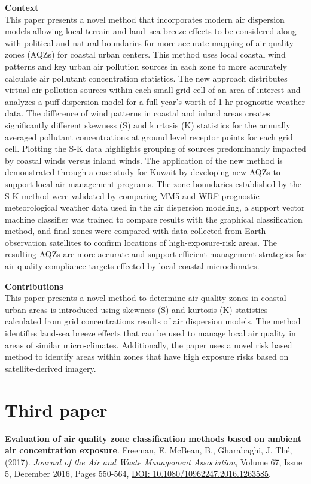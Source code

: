 \vspace{5mm}
\noindent
\textbf{Context}\\
\noindent
This paper presents a novel method that incorporates modern air dispersion models allowing local terrain and land–sea breeze effects to be considered along with political and natural boundaries for more accurate mapping of air quality zones (AQZs) for coastal urban centers. This method uses local coastal wind patterns and key urban air pollution sources in each zone to more accurately calculate air pollutant concentration statistics. The new approach distributes virtual air pollution sources within each small grid cell of an area of interest and analyzes a puff dispersion model for a full year’s worth of 1-hr prognostic weather data. The difference of wind patterns in coastal and inland areas creates significantly different skewness (S) and kurtosis (K) statistics for the annually averaged pollutant concentrations at ground level receptor points for each grid cell. Plotting the S-K data highlights grouping of sources predominantly impacted by coastal winds versus inland winds. The application of the new method is demonstrated through a case study for Kuwait by developing new AQZs to support local air management programs. The zone boundaries established by the S-K method were validated by comparing MM5 and WRF prognostic meteorological weather data used in the air dispersion modeling, a support vector machine classifier was trained to compare results with the graphical classification method, and final zones were compared with data collected from Earth observation satellites to confirm locations of high-exposure-risk areas. The resulting AQZs are more accurate and support efficient management strategies for air quality compliance targets effected by local coastal microclimates.

\vspace{5mm}
\noindent
\textbf{Contributions}\\
\noindent
This paper presents a novel method to determine air quality zones in coastal urban areas is introduced using skewness (S) and kurtosis (K) statistics calculated from grid concentrations results of air dispersion models.  The method identifies land-sea breeze effects that can be used to manage local air quality in areas of similar micro-climates. Additionally, the paper uses a novel risk based method to identify areas within zones that have high exposure risks based on satellite-derived imagery.

\section{Third paper}
\noindent
\textbf{Evaluation of air quality zone classification methods based on ambient air concentration exposure}. Freeman, E. McBean, B., Gharabaghi, J.  Th\'e, (2017). \textit{Journal of the Air and Waste Management Association}, Volume 67, Issue 5, December 2016, Pages 550-564, \url{DOI: 10.1080/10962247.2016.1263585}.

